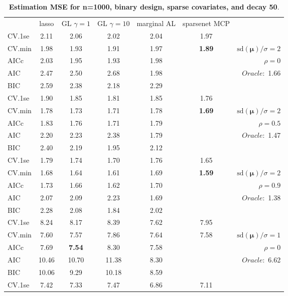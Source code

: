 \begin{table}\vspace{-.5cm}
\caption[l]{ { \bf Estimation MSE for n=1000, binary design, 
sparse covariates, and  decay  50}.}
\vspace{-.5cm}
\footnotesize{}
\begin{center}
\begin{tabular}{l*{5}{c}|r}
& lasso & GL $\gamma=1$ & GL $\gamma=10$ & marginal AL & sparsenet MCP  & \\
 \cline{1-7}
CV.1se & 2.11 & 2.06 & 2.02 & 2.04 & 1.97 & \\
CV.min & 1.98 & 1.93 & 1.91 & 1.97 & {\bf 1.89} &  $\mathrm{sd}(\mathbf{\mu})/\sigma=2$ \\
AICc & 2.03 & 1.95 & 1.93 & 1.98 & & $\rho=0$ \\
AIC & 2.47 & 2.50 & 2.68 & 1.98 & &  \multirow{2}{*}{$Oracle: $ 1.66} \\
BIC & 2.59 & 2.38 & 2.18 & 2.29 & &  \\
 \hline 
CV.1se & 1.90 & 1.85 & 1.81 & 1.85 & 1.76 & \\
CV.min & 1.78 & 1.73 & 1.71 & 1.78 & {\bf 1.69} &  $\mathrm{sd}(\mathbf{\mu})/\sigma=2$ \\
AICc & 1.83 & 1.76 & 1.71 & 1.79 & & $\rho=0.5$ \\
AIC & 2.20 & 2.23 & 2.38 & 1.79 & &  \multirow{2}{*}{$Oracle: $ 1.47} \\
BIC & 2.40 & 2.19 & 1.95 & 2.12 & &  \\
 \hline 
CV.1se & 1.79 & 1.74 & 1.70 & 1.76 & 1.65 & \\
CV.min & 1.68 & 1.64 & 1.61 & 1.69 & {\bf 1.59} &  $\mathrm{sd}(\mathbf{\mu})/\sigma=2$ \\
AICc & 1.73 & 1.66 & 1.62 & 1.70 & & $\rho=0.9$ \\
AIC & 2.07 & 2.09 & 2.23 & 1.69 & &  \multirow{2}{*}{$Oracle: $ 1.38} \\
BIC & 2.28 & 2.08 & 1.84 & 2.02 & &  \\
 \hline 
CV.1se & 8.24 & 8.17 & 8.39 & 7.62 & 7.95 & \\
CV.min & 7.60 & 7.57 & 7.86 & 7.64 & 7.58 &  $\mathrm{sd}(\mathbf{\mu})/\sigma=1$ \\
AICc & 7.69 & {\bf 7.54} & 8.30 & 7.58 & & $\rho=0$ \\
AIC & 10.46 & 10.70 & 11.38 & 8.30 & &  \multirow{2}{*}{$Oracle: $ 6.62} \\
BIC & 10.06 & 9.29 & 10.18 & 8.59 & &  \\
 \hline 
CV.1se & 7.42 & 7.33 & 7.47 & 6.86 & 7.11 & \\

\end{tabular}
\end{center}
\end{table}
